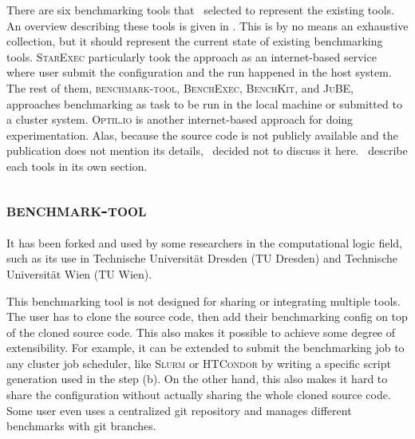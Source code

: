 There are six benchmarking tools that \first~selected to represent the existing tools.
An overview describing these  tools is given in .
This is by no means an exhaustive collection, but it should represent the current state of existing benchmarking tools.
\textsc{StarExec} particularly took the approach as an internet-based service where user submit the configuration and the run happened in the host system.
The rest of them, \textsc{benchmark-tool}, \textsc{BenchExec}, \textsc{BenchKit}, and \textsc{JuBE}, approaches benchmarking as task to be run in the local machine or submitted to a cluster system.
\textsc{Optil.io} \citep{wasikOptilIoCloud2016a} is another internet-based approach for doing experimentation.
Alas, because the source code is not publicly available and the publication does not mention its details, \first~decided not to discuss it here.
\First~describe each tools in its own section.

\subsection{\textsc{benchmark-tool}}

It has been forked and used by some researchers in the computational logic field, such as its use in Technische Universit\"at Dresden (TU Dresden) and Technische Universit\"at Wien (TU Wien).


This benchmarking tool is not designed for sharing or integrating multiple tools.
The user has to clone the source code, then add their benchmarking config on top of the cloned source code.
This also makes it possible to achieve some degree of extensibility.
For example, it can be extended to submit the benchmarking job to any cluster job scheduler, like \textsc{Slurm} \citep{yoo2003slurm} or \textsc{HTCondor} \citep{condor-practice} by writing a specific script generation used in the step (b).
On the other hand, this also makes it hard to share the configuration without actually sharing the whole cloned source code.
Some user even uses a centralized git repository and manages different benchmarks with git branches.

